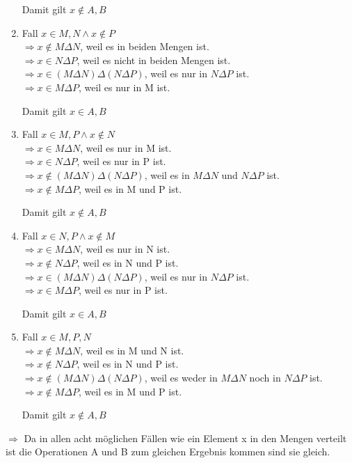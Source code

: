 \documentclass{article}
\begin{document}
\begin{enumerate}
        Damit gilt \(x \notin A, B \) 

        \item Fall \(x \in M, N \land x \notin P \) \\
        \(\Rightarrow x \notin M \Delta N \), weil es in beiden Mengen ist. \\
        \(\Rightarrow x \in N \Delta P \), weil es nicht in beiden Mengen ist. \\
        \(\Rightarrow x \in ( M \Delta N )\Delta(N \Delta P ) \), weil es nur in \(N \Delta P\) ist. \\
        \(\Rightarrow x \in M \Delta P \), weil es nur in M ist.

        Damit gilt \(x \in A, B \) 

        \item Fall \(x \in M, P \land x \notin N \) \\
        \(\Rightarrow x \in M \Delta N \), weil es nur in M ist. \\
        \(\Rightarrow x \in N \Delta P \), weil es nur in P ist. \\
        \(\Rightarrow x \notin ( M \Delta N )\Delta(N \Delta P ) \), weil es in \(M \Delta N\) und \(N \Delta P\) ist. \\
        \(\Rightarrow x \notin M \Delta P \), weil es in M und P ist.

        Damit gilt \(x \notin A, B \) 
        
        \item Fall \(x \in N, P \land x \notin M \) \\
        \(\Rightarrow x \in M \Delta N \), weil es nur in N ist. \\
        \(\Rightarrow x \notin N \Delta P \), weil es in N und P ist. \\
        \(\Rightarrow x \in ( M \Delta N )\Delta(N \Delta P ) \), weil es nur in \(N \Delta P\) ist. \\
        \(\Rightarrow x \in M \Delta P \), weil es nur in P ist.

        Damit gilt \(x \in A, B \)

        \item Fall \(x \in M, P, N \) \\
        \(\Rightarrow x \notin M \Delta N \), weil es in M und N ist. \\
        \(\Rightarrow x \notin N \Delta P \), weil es in N und P ist. \\
        \(\Rightarrow x \notin ( M \Delta N )\Delta(N \Delta P ) \), weil es weder in \(M \Delta N\) noch in \(N \Delta P\) ist. \\
        \(\Rightarrow x \notin M \Delta P \), weil es in M und P ist.

        Damit gilt \(x \notin A, B \) 
    \end{enumerate}
    \( \Rightarrow \) Da in allen acht möglichen Fällen wie ein Element x
    in den Mengen verteilt ist die Operationen A und B zum gleichen Ergebnis kommen sind sie gleich.
\end{document}
